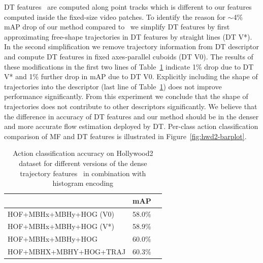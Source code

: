 \documentclass[10pt,twocolumn,letterpaper]{article}
\begin{document}

DT features~\cite{Wang12} are computed along point tracks which is different to our features computed inside the fixed-size video patches. To identify the reason for $\sim$4\% mAP drop of our method compared to~\cite{Wang12} we simplify DT features by first approximating free-shape trajectories in DT features by straight lines (DT V*). In the second simplification we remove trajectory information from DT descriptor and compute DT features in fixed axes-parallel cuboids (DT V0). The results of these modifications in the first two lines of Table~\ref{tab:HWD2traj} indicate 1\% drop due to DT V* and 1\% further drop in mAP due to DT V0. Explicitly including the shape of trajectories into the descriptor (last line of Table~\ref{tab:HWD2traj}) does not improve performance significantly. From this experiment we conclude that the shape of trajectories does not contribute to other descriptors significantly. We believe that the difference in accuracy of DT features and our method should be in the denser and more accurate flow estimation deployed by DT. Per-class action classification comparison of MF and DT features is illustrated in Figure~\ref{fig:hwd2-barplot}.

\begin{table}
\begin{center}
\begin{tabular}{|l|c|c|}
\hline
& mAP \\\hline
HOF+MBHx+MBHy+HOG (V0)  					& 58.0\%	\\\hline
HOF+MBHx+MBHy+HOG (V*)						& 58.9\%	\\\hline
HOF+MBHx+MBHy+HOG \cite{Wang12}     	& 60.0\% 	\\\hline
HOF+MBHX+MBHY+HOG+TRAJ \cite{Wang12} 	& 60.3\% 	\\\hline
\end{tabular}
\mbox{}\vspace{.2cm}\\
\caption{Action classification accuracy on Hollywood2 dataset for different versions of the dense trajectory features~\cite{Wang12} in combination with histogram encoding}
\label{tab:HWD2traj}
\end{center}
\end{table}
\end{document}
